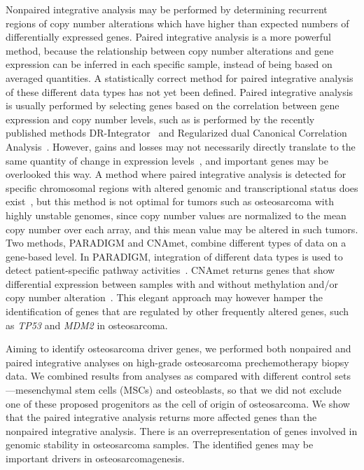 Nonpaired integrative analysis may be performed
by determining recurrent regions of copy
number alterations which have higher than
expected numbers of differentially expressed
genes. Paired integrative analysis is a more powerful
method, because the relationship between copy
number alterations and gene expression can be
inferred in each specific sample, instead of being
based on averaged quantities. A statistically correct
method for paired integrative analysis of these different
data types has not yet been defined. Paired
integrative analysis is usually performed by selecting
genes based on the correlation between gene
expression and copy number levels, such as is performed
by the recently published methods DR-Integrator~\cite{salari2010dr}
and Regularized dual
Canonical Correlation Analysis~\cite{soneson2010integrative}.
However, gains and losses may not necessarily
directly translate to the same quantity of change
in expression levels~\cite{lee2008integrative}, and important
genes may be overlooked this way. A method
where paired integrative analysis is detected for
specific chromosomal regions with altered genomic
and transcriptional status does exist~\cite{bicciato2009computational},
but this method is not optimal for tumors
such as osteosarcoma with highly unstable
genomes, since copy number values are normalized
to the mean copy number over each array, and this
mean value may be altered in such tumors. Two
methods, PARADIGM and CNAmet, combine different
types of data on a gene\hyp{}based level. In
PARADIGM, integration of different data types is
used to detect patient\hyp{}specific pathway activities~\cite{vaske2010inference}. CNAmet returns genes that
show differential expression between samples with
and without methylation and/or copy number
alteration~\cite{louhimo2011cnamet}. This
elegant approach may however hamper the identification
of genes that are regulated by other frequently
altered genes, such as {\it TP53} and {\it MDM2} in
osteosarcoma.

Aiming to identify osteosarcoma driver genes,
we performed both nonpaired and paired integrative
analyses on high\hyp{}grade osteosarcoma prechemotherapy
biopsy data. We combined results
from analyses as compared with different control
sets---mesenchymal stem cells (MSCs) and osteoblasts,
so that we did not exclude one of these
proposed progenitors as the cell of origin of osteosarcoma.
We show that the paired integrative
analysis returns more affected genes than the
nonpaired integrative analysis. There is an overrepresentation
of genes involved in genomic stability
in osteosarcoma samples. The identified
genes may be important drivers in
osteosarcomagenesis.

